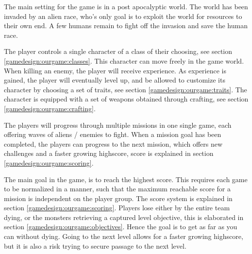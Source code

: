 
The main setting for the game is in a post apocalyptic world.
The world has been invaded by an alien race, who's only goal is to exploit the world for resources to their own end. 
A few humans remain to fight off the invasion and save the human race. 

The player controls a single character of a class of their choosing, see section \ref{gamedesign:ourgame:classes}. 
This character can move freely in the game world.
When killing an enemy, the player will receive experience.
As experience is gained, the player will eventually level up, and be allowed to customize its character by choosing a set of traits, see section \ref{gamedesign:ourgame:traits}.
The character is equipped with a set of weapons obtained through crafting, see section \ref{gamedesign:ourgame:crafting}.

The players will progress through multiple missions in one single game, each offering waves of aliens / enemies to fight. 
When a mission goal has been completed, the players can progress to the next mission, which offers new challenges and a faster growing highscore, score is explained in section \ref{gamedesign:ourgame:scoring}.

The main goal in the game, is to reach the highest score. 
This requires each game to be normalized in a manner, such that the maximum reachable score for a mission is independent on the player group.
The score system is explained in section \ref{gamedesign:ourgame:scoring}. 
Players lose either by the entire team dying, or the monsters retrieving a captured level objective, this is elaborated in section \ref{gamedesign:ourgame:objectives}. 
Hence the goal is to get as far as you can without dying. 
Going to the next level allows for a faster growing highscore, but it is also a risk trying to secure passage to the next level.




